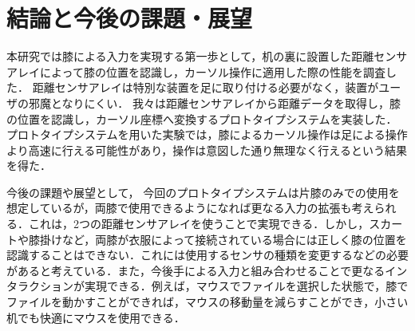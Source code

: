 \documentclass[submit, techrep]{ipsj}
\begin{document}



%

\section{結論と今後の課題・展望}
本研究では膝による入力を実現する第一歩として，机の裏に設置した距離センサアレイによって膝の位置を認識し，カーソル操作に適用した際の性能を調査した．
距離センサアレイは特別な装置を足に取り付ける必要がなく，装置がユーザの邪魔となりにくい．
我々は距離センサアレイから距離データを取得し，膝の位置を認識し，カーソル座標へ変換するプロトタイプシステムを実装した．
プロトタイプシステムを用いた実験では，膝によるカーソル操作は足による操作より高速に行える可能性があり，操作は意図した通り無理なく行えるという結果を得た．\par
今後の課題や展望として，
今回のプロトタイプシステムは片膝のみでの使用を想定しているが，両膝で使用できるようになれば更なる入力の拡張も考えられる．これは，2つの距離センサアレイを使うことで実現できる．しかし，スカートや膝掛けなど，両膝が衣服によって接続されている場合には正しく膝の位置を認識することはできない．これには使用するセンサの種類を変更するなどの必要があると考えている．また，今後手による入力と組み合わせることで更なるインタラクションが実現できる．例えば，マウスでファイルを選択した状態で，膝でファイルを動かすことができれば，マウスの移動量を減らすことができ，小さい机でも快適にマウスを使用できる．
\end{document}
